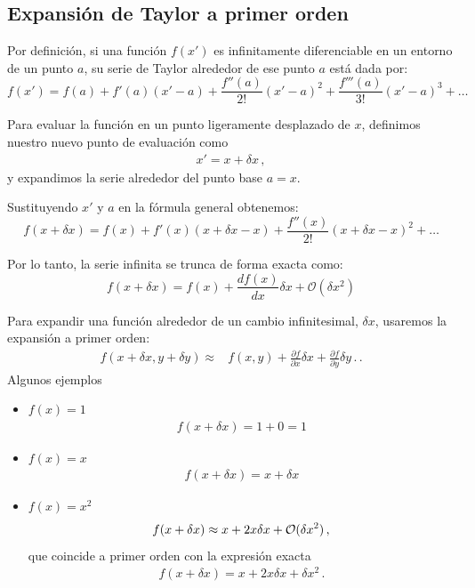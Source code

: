 \begin{frame}
\subsection{Expansión de Taylor a primer orden}
\label{sec:taylor_expansion}

Por definición, si una función $f(x')$ es infinitamente diferenciable en un entorno de un punto $a$, su serie de Taylor alrededor de ese punto $a$ está dada por:
\begin{equation}
    f(x') = f(a) + f'(a)(x' - a) + \frac{f''(a)}{2!}(x' - a)^2 + \frac{f'''(a)}{3!}(x' - a)^3 + \dots
\end{equation}

Para evaluar la función en un punto ligeramente desplazado de $x$, definimos nuestro nuevo punto de evaluación como
\begin{align}
x' = x + \delta x\,,  
\end{align}
y expandimos la serie alrededor del punto base $a = x$. 

Sustituyendo $x'$ y $a$ en la fórmula general obtenemos:
\begin{equation}
    f(x + \delta x) = f(x) + f'(x)(x + \delta x - x) + \frac{f''(x)}{2!}(x + \delta x - x)^2 + \dots
\end{equation}

Por lo tanto, la serie infinita se trunca de forma exacta como:
\begin{equation}
    f(x+\delta x) = f(x) + \frac{df(x)}{dx}\delta x + \mathcal{O}(\delta x^2)
\end{equation}


Para expandir una función alrededor de un cambio infinitesimal, $\delta x$, usaremos la expansión a primer orden:
\begin{align}
  f(x+\delta x,y+\delta y) \approx &f(x,y) + \frac{\partial f}{\partial x}\delta x + \frac{\partial f}{\partial y}\delta y\,.\,.
\end{align}
Algunos ejemplos
\begin{itemize}
\item $f(x) =1$
  \begin{align*}
    f(x+\delta x) = 1 + 0 = 1 
  \end{align*}
\item $f(x) =x$
  \begin{align*}
    f(x+\delta x) = x + \delta x  
  \end{align*}
\item $f(x) =x^2$
  \begin{align*}
    f(x+\delta x) \approx x +2x \delta x + {\cal O}(\delta x^2)  \,,
  \end{align*}
que coincide a primer orden con la expresión exacta
  \begin{align*}
    f(x+\delta x) = x +2x \delta x + \delta x^2\,.
  \end{align*}
  

\end{itemize}
\end{frame}
